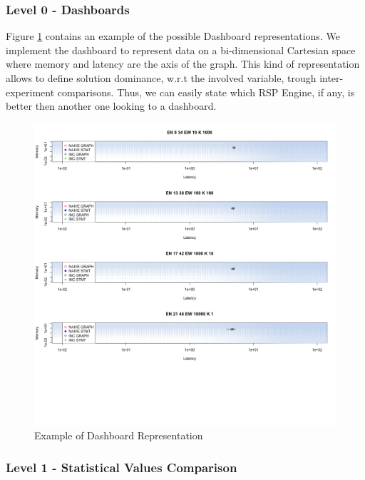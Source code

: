 \subsubsection{Level 0 - Dashboards}\label{sec:impl-level0}

\noindent Figure \ref{fig:dashboard-example} contains an example of the possible Dashboard representations. We implement the dashboard to represent data on a bi-dimensional Cartesian space where memory and latency are the axis of the graph. This kind of representation allows to define solution dominance, w.r.t the involved variable, trough inter-experiment comparisons. Thus, we can easily state which RSP Engine, if any, is better then another one looking to a dashboard.

\begin{figure}[tbh]
  \centering
	\includegraphics[width=0.45\linewidth]{images/dashboard-example}
	\caption{Example of Dashboard Representation} 
  	\label{fig:dashboard-example}
\end{figure}


\subsubsection{Level 1 -  Statistical Values Comparison}\label{sec:impl-level1}

